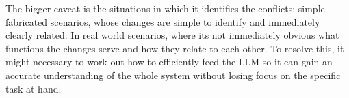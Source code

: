 The bigger caveat is the situations in which it identifies the conflicts: simple fabricated scenarios, whose changes are simple to identify and immediately clearly related. In real world scenarios, where its not immediately obvious what functions the changes serve and how they relate to each other. To resolve this, it might necessary to work out how to efficiently feed the LLM so it can gain an accurate understanding of the whole system without losing focus on the specific task at hand.
